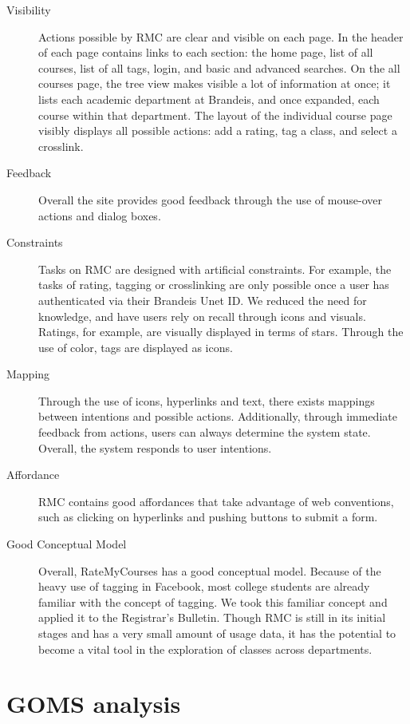 \documentclass[12pt]{report}
\begin{document}
\begin{description}
\item[Visibility] Actions possible by RMC are clear and visible on each page. In the header of each page contains links to each section: the home page, list of all courses, list of all tags, login, and basic and advanced searches. On the all courses page, the tree view makes visible a lot of information at once; it lists each academic department at Brandeis, and once expanded, each course within that department. The layout of the individual course page visibly displays all possible actions: add a rating, tag a class, and select a crosslink.
\item[Feedback] Overall the site provides good feedback through the use of mouse-over actions and dialog boxes.
\item[Constraints] Tasks on RMC are designed with artificial constraints. For example, the tasks of rating, tagging or crosslinking are only possible once a user has authenticated via their Brandeis Unet ID. We reduced the need for knowledge, and have users rely on recall through icons and visuals. Ratings, for example, are visually displayed in terms of stars. Through the use of color, tags are displayed as icons.
\item[Mapping] Through the use of icons, hyperlinks and text, there exists mappings between intentions and possible actions. Additionally, through immediate feedback from actions, users can always determine the system state. Overall, the system responds to user intentions.
\item[Affordance] RMC contains good affordances that take advantage of web conventions, such as clicking on hyperlinks and pushing buttons to submit a form.
\item[Good Conceptual Model] Overall, RateMyCourses has a good conceptual model. Because of the heavy use of tagging in Facebook, most college students are already familiar with the concept of tagging. We took this familiar concept and applied it to the Registrar’s Bulletin. Though RMC is still in its initial stages and has a very small amount of usage data, it has the potential to become a vital tool in the exploration of classes across departments.
\end{description}

\section{GOMS analysis}
\end{document}
